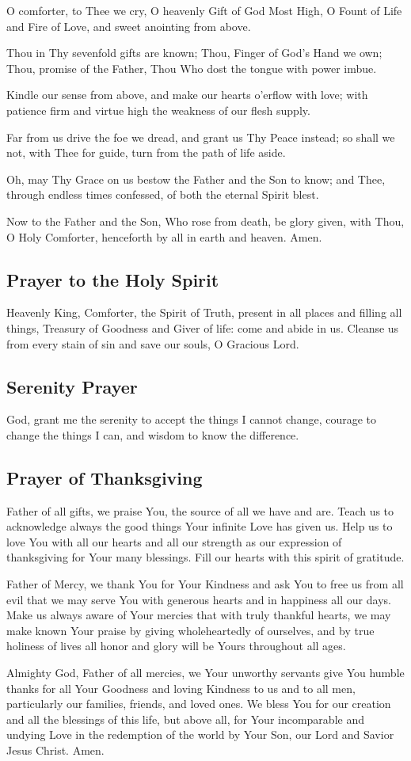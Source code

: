 \documentclass[12pt]{article}
\newcommand{\prayertitle}[1]{\subsection{#1}}
\begin{document}
O comforter, to Thee we cry,
O heavenly Gift of God Most High,
O Fount of Life and Fire of Love,
and sweet anointing from above.

Thou in Thy sevenfold gifts are known;
Thou, Finger of God's Hand we own;
Thou, promise of the Father, Thou
Who dost the tongue with power imbue.

Kindle our sense from above,
and make our hearts o'erflow with love;
with patience firm and virtue high
the weakness of our flesh supply.

Far from us drive the foe we dread,
and grant us Thy Peace instead;
so shall we not, with Thee for guide,
turn from the path of life aside.

Oh, may Thy Grace on us bestow
the Father and the Son to know;
and Thee, through endless times confessed,
of both the eternal Spirit blest.

Now to the Father and the Son,
Who rose from death, be glory given,
with Thou, O Holy Comforter,
henceforth by all in earth and heaven.
Amen.

\prayertitle{Prayer to the Holy Spirit}
Heavenly King, Comforter, the Spirit of Truth, present in all places and filling all things, Treasury of Goodness and Giver of life: come and abide in us.
Cleanse us from every stain of sin and save our souls, O Gracious Lord.

\prayertitle{Serenity Prayer}
God, grant me the serenity to accept the things I cannot change,
courage to change the things I can,
and wisdom to know the difference.

\prayertitle{Prayer of Thanksgiving}
Father of all gifts, we praise You, the source of all we have and are.
Teach us to acknowledge always the good things Your infinite Love has given us.
Help us to love You with all our hearts and all our strength as our expression of thanksgiving for Your many blessings.
Fill our hearts with this spirit of gratitude.

Father of Mercy, we thank You for Your Kindness and ask You to free us from all evil that we may serve You with generous hearts and in happiness all our days.
Make us always aware of Your mercies that with truly thankful hearts, we may make known Your praise by giving wholeheartedly of ourselves, and by true holiness of lives all honor and glory will be Yours throughout all ages.

Almighty God, Father of all mercies, we Your unworthy servants give You humble thanks for all Your Goodness and loving Kindness to us and to all men, particularly our families, friends, and loved ones.
We bless You for our creation and all the blessings of this life, but above all, for Your incomparable and undying Love in the redemption of the world by Your Son, our Lord and Savior Jesus Christ.
Amen.
\end{document}
